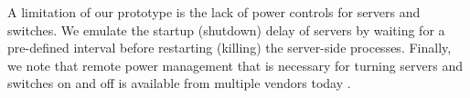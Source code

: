 
A limitation of our prototype is the lack of power controls for servers and switches. We emulate the startup (shutdown) delay of servers by waiting for a pre-defined interval before  restarting (killing) the server-side processes.  Finally, we note that remote power management that is necessary for turning servers and switches on and off is available from multiple vendors today \cite{s-power,s2-power}.


